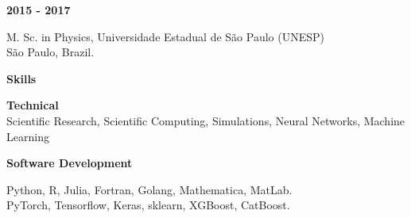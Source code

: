 \documentclass[a4paper,12pt,final]{memoir}
\newcommand{\SmallSep}{\vspace{0.5em}}
\newcommand{\CVSection}[1]
	{\Large\textbf{#1}\par
	\SmallSep\normalsize\normalfont}
\newcommand{\CVItem}[1]
	{\textbf{\color{RoyalBlue} #1}}
\begin{document}
\CVItem{2015 - 2017}\\
\begin{small}
M. Sc. in Physics, Universidade Estadual de S\~{a}o Paulo (UNESP)\\
S\~{a}o Paulo, Brazil.
\end{small}
\SmallSep



\CVSection{Skills}


\CVItem{Technical}\\
{\small Scientific Research, Scientific Computing, Simulations, Neural Networks, Machine Learning\\}
\vspace{-10pt}
\SmallSep

\CVItem{Software Development}\\
\begin{small}
Python, R, Julia, Fortran, Golang, Mathematica, MatLab.\\
PyTorch, Tensorflow, Keras, sklearn, XGBoost, CatBoost.\\
\end{small}





\end{document}
